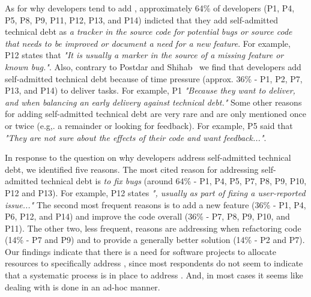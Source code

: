 As for why developers tend to add \SATD, approximately 64\% of developers (P1, P4, P5, P8, P9, P11, P12, P13, and P14) indicted that they add self-admitted technical debt as \emph{a tracker in the source code for potential bugs or source code that needs to be improved or document a need for a new feature}. For example, P12 states that \textit{"It is usually a marker in the source of a missing feature or known bug."}. Also, contrary to Postdar and Shihab~ we find that developers add self-admitted technical debt because of time pressure (approx. 36\% - P1, P2, P7, P13, and P14) to deliver tasks. For example, P1 \textit{"Because they want to deliver, and when balancing an early delivery against technical debt."} Some other reasons for adding self-admitted technical debt are very rare and are only mentioned once or twice (e.g,. a remainder or looking for feedback). For example, P5 said that \textit{"They are not sure about the effects of their code and want feedback..."}.

In response to the question on why developers address self-admitted technical debt, we identified five reasons. The most cited reason for addressing self-admitted technical debt is \emph{to fix bugs} (around 64\% - P1, P4, P5, P7, P8, P9, P10, P12 and P13). For example, P12 states \textit{", usually as part of fixing a user-reported issue..."} The second most frequent reasons is to add a new feature (36\% - P1, P4, P6, P12, and P14) and improve the code overall (36\% - P7, P8, P9, P10, and P11). The other two, less frequent, reasons are addressing \SATD when refactoring code (14\% - P7 and P9) and to provide a generally better solution (14\% - P2 and P7). Our findings indicate that there is a need for software projects to allocate resources to specifically address \SATD, since most respondents do not seem to indicate that a systematic process is in place to address \SATD. And, in most cases it seems like dealing with \SATD is done in an ad-hoc manner.



 
 
 